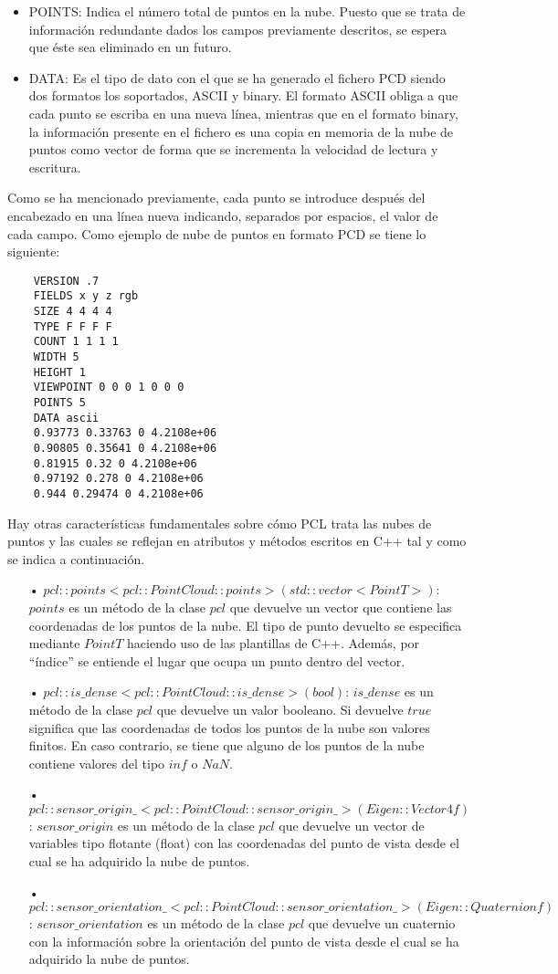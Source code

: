 \begin{itemize}
\item POINTS:
Indica el número total de puntos en la nube. Puesto que se trata de información redundante dados los campos previamente descritos, se espera que éste sea eliminado en un futuro.

\item DATA:
Es el tipo de dato con el que se ha generado el fichero PCD siendo dos formatos los soportados, ASCII y binary. El formato ASCII obliga a que cada punto se escriba en una nueva línea, mientras que en el formato binary, la información presente en el fichero es una copia en memoria de la nube de puntos como vector de forma que se incrementa la velocidad de lectura y escritura.
\end{itemize}

Como se ha mencionado previamente, cada punto se introduce después del encabezado en una línea nueva indicando, separados por espacios, el valor de cada campo. Como ejemplo de nube de puntos en formato PCD se tiene lo siguiente:

\begin{lstlisting}
	VERSION .7
	FIELDS x y z rgb
	SIZE 4 4 4 4
	TYPE F F F F
	COUNT 1 1 1 1
	WIDTH 5
	HEIGHT 1
	VIEWPOINT 0 0 0 1 0 0 0
	POINTS 5
	DATA ascii
	0.93773 0.33763 0 4.2108e+06
	0.90805 0.35641 0 4.2108e+06
	0.81915 0.32 0 4.2108e+06
	0.97192 0.278 0 4.2108e+06
	0.944 0.29474 0 4.2108e+06
\end{lstlisting}

Hay otras características fundamentales\cite{PCD_extras} sobre cómo PCL trata las nubes de puntos y las cuales se reflejan en atributos y métodos escritos en C++ tal y como se indica a continuación.

\begin{itemize}
\item[•]$pcl::points<pcl::PointCloud::points> (std::vector<PointT>)$: $points$ es un método de la clase $pcl$ que devuelve un vector que contiene las coordenadas de los puntos de la nube. El tipo de punto devuelto se especifica mediante $PointT$ haciendo uso de las plantillas de C++. Además, por ``índice'' se entiende el lugar que ocupa un punto dentro del vector.
\item[•]$pcl::is\_dense<pcl::PointCloud::is\_dense> (bool)$: $is\_dense$ es un método de la clase $pcl$ que devuelve un valor booleano. Si devuelve $true$ significa que las coordenadas de todos los puntos de la nube son valores finitos. En caso contrario, se tiene que alguno de los puntos de la nube contiene valores del tipo $inf$ o $NaN$.
\item[•]$pcl::sensor\_origin\_<pcl::PointCloud::sensor\_origin\_> (Eigen::Vector4f)$: $sensor\_origin$ es un método de la clase $pcl$ que devuelve un vector de variables tipo flotante (float) con las coordenadas del punto de vista desde el cual se ha adquirido la nube de puntos.

\item[•]$pcl::sensor\_orientation\_<pcl::PointCloud::sensor\_orientation\_> (Eigen::Quaternionf)$: $sensor\_orientation$ es un método de la clase $pcl$ que devuelve un cuaternio con la información sobre la orientación del punto de vista desde el cual se ha adquirido la nube de puntos.
\end{itemize}


